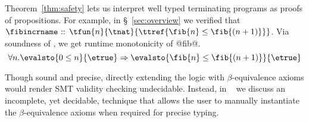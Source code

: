 Theorem~\ref{thm:safety} lets us interpret well typed terminating programs as proofs of
propositions.
%
For example, in \S~\ref{sec:overview} we verified that
%
$\fibincrname\text{ :: }{\tfun{n}{\tnat}{\ttref{\fib{n} \leq \fib{(n+1)}}}}$.
%
Via soundness of \corelan, we get runtime monotonicity of @fib@.
$$
\forall n. \evalsto{0 \leq n}{\etrue} \Rightarrow \evalsto{\fib{n} \leq \fib{(n+1)}}{\etrue}
$$

%
Though sound and precise, directly extending the logic with $\beta$-equivalence axioms
would render SMT validity checking undecidable.
%
Instead, in ~\citep{appendix} we discuss an incomplete,
yet decidable, technique that allows the
user to manually instantiate the $\beta$-equivalence axioms
when required for precise typing.
